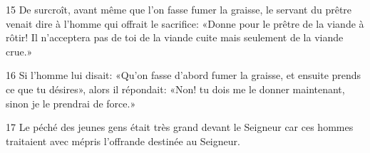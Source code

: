 
15 De surcroît, avant même que l’on fasse fumer la graisse, le servant du prêtre venait dire à l’homme qui offrait le sacrifice: «Donne pour le prêtre de la viande à rôtir! Il n’acceptera pas de toi de la viande cuite mais seulement de la viande crue.»

16 Si l’homme lui disait: «Qu’on fasse d’abord fumer la graisse, et ensuite prends ce que tu désires», alors il répondait: «Non! tu dois me le donner maintenant, sinon je le prendrai de force.»

17 Le péché des jeunes gens était très grand devant le Seigneur car ces hommes traitaient avec mépris l’offrande destinée au Seigneur.
